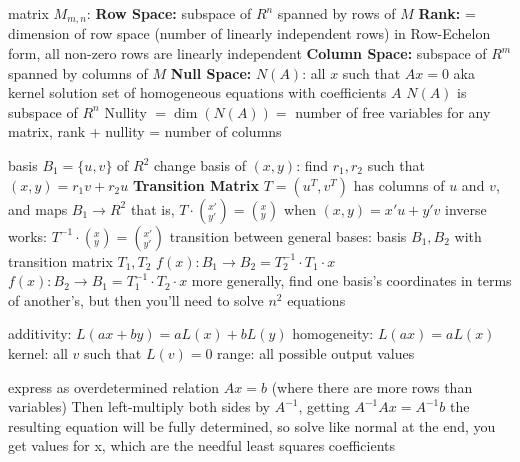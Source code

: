 \documentclass[12pt]{article}
\begin{document}
\begin{multicols*}{2}
\begin{flushleft}
\begin{outline}[longenum]
  \1 matrix $M_{m,n}$:
  \1 \textbf{Row Space:} subspace of $R^n$ spanned by rows of $M$
    \2 \textbf{Rank:} = dimension of row space (number of linearly independent rows)
    \2 in Row-Echelon form, all non-zero rows are linearly independent
  \1 \textbf{Column Space:} subspace of $R^m$ spanned by columns of $M$
  \1 \textbf{Null Space:} $N(A)$: all $x$ such that $Ax=0$
    \2 aka kernel
    \2 solution set of homogeneous equations with coefficients $A$
    \2 $N(A)$ is subspace of $R^n$
    \2 Nullity $=\dim(N(A))=$ number of free variables
  \1 for any matrix, rank + nullity = number of columns

  \1 basis $B_1=\{u,v\}$ of $R^2$
  \1 change basis of $(x,y)$: find $r_1,r_2$ such that $(x,y) = r_1v + r_2u$
  \1 \textbf{Transition Matrix} $T=(u^T,v^T)$ has columns of $u$ and $v$, and maps $B_1\rightarrow R^2$
    \2 that is, $T\cdot(^{x'}_{y'}) = (^x_y)$ when $(x,y)=x'u+y'v$
    \2 inverse works: $T^{-1}\cdot(^x_y) = (^{x'}_{y'})$
  \1 transition between general bases:
    \2 basis $B_1,B_2$ with transition matrix $T_1,T_2$
    \2 $f(x): B_1 \rightarrow B_2 = T_2^{-1}\cdot T_1 \cdot x $
    \2 $f(x): B_2 \rightarrow B_1 = T_1^{-1}\cdot T_2 \cdot x $
    \2 more generally, find one basis's coordinates in terms of another's, but then you'll need to solve $n^2$ equations

  \1 additivity:  $L(ax+by) = aL(x)+bL(y)$
  \1 homogeneity: $L(ax) = aL(x)$
  \1 kernel: all $v$ such that $L(v)=0$
  \1 range: all possible output values

  \1 express as overdetermined relation $Ax = b$ (where there are more rows than variables)
  \1 Then left-multiply both sides by $A^{-1}$, getting $A^{-1}Ax=A^{-1}b$
  \1 the resulting equation will be fully determined, so solve like normal
  \1 at the end, you get values for x, which are the needful least squares coefficients



\end{outline}
\end{flushleft}
\end{multicols*}
\end{document}
